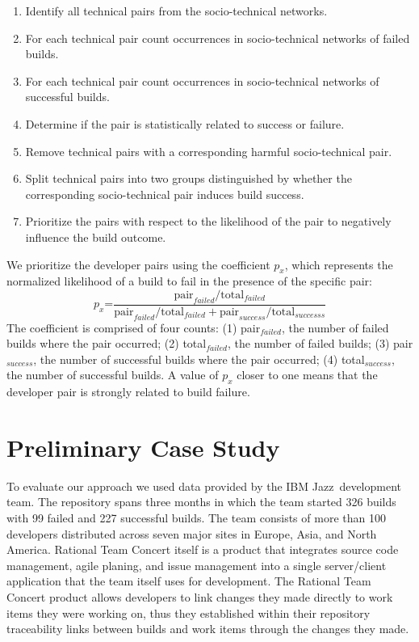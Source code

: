 \documentclass[conference]{IEEEtran}
\begin{document}
\begin{enumerate}
\item Identify all technical pairs from the socio-technical networks.
\item For each technical pair count occurrences in socio-technical networks of
failed builds.
\item For each technical pair count occurrences in socio-technical networks of
successful builds.
\item Determine if the pair is statistically related to success or failure.
\item Remove technical pairs with a corresponding harmful socio-technical pair.
\item Split technical pairs into two groups distinguished by whether the corresponding socio-technical pair induces build success.
\item Prioritize the pairs with respect to the likelihood of the pair to negatively influence the build outcome.
\end{enumerate}

We prioritize the developer pairs using the coefficient $p_x$,
which represents the normalized likelihood of a build
to fail in the presence of the specific pair:
$$
p_x\text{=}\frac{ \text{pair}_{failed} / \text{total}_{failed} }
                     { \text{pair}_{failed} / \text{total}_{failed} + \text{pair}_{success} / \text{total}_{successs}}
$$
The coefficient is comprised of four counts: (1) pair$_{failed}$, the number of failed builds where the pair occurred; (2) total$_{failed}$, the number of failed builds; (3) pair$_{success}$, the number of successful builds where the pair occurred; (4) total$_{success}$, the number of successful builds.
A value of $p_x$ closer to one means that the developer pair is strongly related to build
failure. 

\section{Preliminary Case Study}
To evaluate our approach we used data provided by the IBM Jazz\texttrademark\ development team.
The repository spans three months in which the team started 326 builds with 99 failed and 227 successful builds.
The team consists of more than 100 developers distributed across seven major sites in Europe, Asia, and North America.
Rational Team Concert itself is a product that integrates source code management, agile planing, and issue management into a single server/client application that the team itself uses for development.
The Rational Team Concert product allows developers to link changes they made directly to work items they were working on, thus they established within their repository traceability links between builds and work items through the changes they made.
\end{document}
